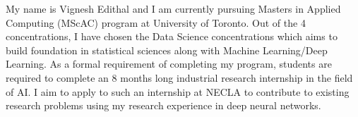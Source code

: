 \documentclass{resume}
\begin{document}
My name is Vignesh Edithal and I am currently pursuing Masters in Applied Computing (MScAC) program at University of Toronto.
Out of the 4 concentrations, I have chosen the Data Science concentrations which aims to build foundation
in statistical sciences along with Machine Learning/Deep Learning. As a formal requirement of completing my program,
students are required to complete an 8 months long industrial research internship in the field of AI.
I aim to apply to such an internship at NECLA to contribute to existing research problems using my research experience
in deep neural networks.
\end{document}
